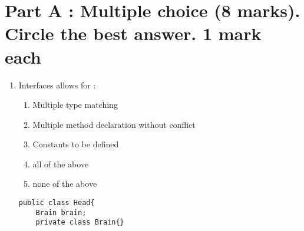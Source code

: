 \documentclass{article}
\begin{document}
\section{Part A : Multiple choice (8 marks). Circle the best answer. 1 mark each}
\begin{enumerate}
	\item Interfaces allows for :
	\begin{enumerate}
		\item Multiple type matching
		\item Multiple method declaration without conflict
		\item Constants to be defined
		\item all of the above
		\item none of the above
	\end{enumerate}
	\begin{lstlisting} 
public class Head{
	Brain brain;
	private class Brain{}
			

\end{lstlisting}
\end{enumerate}
\end{document}
